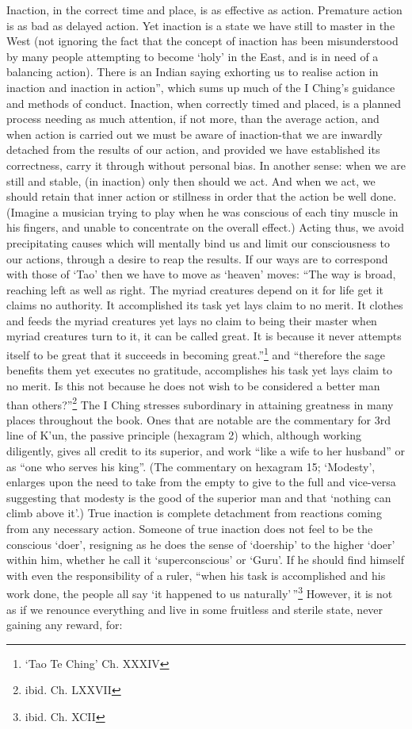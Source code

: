 \documentclass[11pt]{book}
\begin{document}
Inaction, in the correct time and place, is as effective as action. Premature action is as bad as delayed action. Yet inaction is a state we have still to master in the West (not ignoring the fact that the concept of inaction has been misunderstood by many people attempting to become `holy' in the East, and is in need of a balancing action). There is an Indian saying exhorting us to realise action in inaction and inaction in action'', which sums up much of the I Ching's guidance and methods of conduct. Inaction, when correctly timed and placed, is a planned process needing as much attention, if not more, than the average action, and when action is carried out we must be aware of inaction-that we are inwardly detached from the results of our action, and provided we have established its correctness, carry it through without personal bias. In another sense: when we are still and stable, (in inaction) only then should we act. And when we act, we should retain that inner action or stillness in order that the action be well done. (Imagine a musician trying to play when he was conscious of each tiny muscle in his fingers, and unable to concentrate on the overall effect.) Acting thus, we avoid precipitating causes which will mentally bind us and limit our consciousness to our actions, through a desire to reap the results. If our ways are to correspond with those of `Tao' then we have to move as `heaven' moves: ``The way is broad, reaching left as well as right. The myriad creatures depend on it for life get it claims no authority. It accomplished its task yet lays claim to no merit. It clothes and feeds the myriad creatures yet lays no claim to being their master when myriad creatures turn to it, it can be called great. It is because it never attempts itself to be great that it succeeds in becoming great.''\footnote{`Tao Te Ching' Ch. XXXIV} and ``therefore the sage benefits them yet executes no gratitude, accomplishes his task yet lays claim to no merit. Is this not because he does not wish to be considered a better man than others?''\footnote{ibid. Ch. LXXVII} The I Ching stresses subordinary in attaining greatness in many places throughout the book. Ones that are notable are the commentary for 3rd line of K'un, the passive principle (hexagram 2) which, although working diligently, gives all credit to its superior, and work ``like a wife to her husband'' or as ``one who serves his king''. (The commentary on hexagram 15; `Modesty', enlarges upon the need to take from the empty to give to the full and vice-versa suggesting that modesty is the good of the superior man and that `nothing can climb above it'.) True inaction is complete detachment from reactions coming from any necessary action. Someone of true inaction does not feel to be the conscious `doer', resigning as he does the sense of `doership' to the higher `doer' within him, whether he call it `superconscious' or `Guru'. If he should find himself with even the responsibility of a ruler, ``when his task is accomplished and his work done, the people all say `it happened to us naturally'\,''\footnote{ibid. Ch. XCII} However, it is not as if we renounce everything and live in some fruitless and sterile state, never gaining any reward, for:\\
\end{document}

